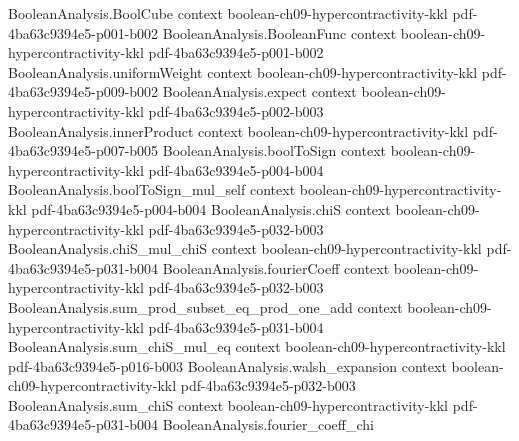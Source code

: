 \begin{lemma}
\leanok
{}
\label{BooleanAnalysis.Hypercontractivity.noise_op_norm_dual}
\proofstep
  {BooleanAnalysis.BoolCube}
  {context}
  {boolean-ch09-hypercontractivity-kkl}
  {pdf-4ba63c9394e5-p001-b002}
\proofstep
  {BooleanAnalysis.BooleanFunc}
  {context}
  {boolean-ch09-hypercontractivity-kkl}
  {pdf-4ba63c9394e5-p001-b002}
\proofstep
  {BooleanAnalysis.uniformWeight}
  {context}
  {boolean-ch09-hypercontractivity-kkl}
  {pdf-4ba63c9394e5-p009-b002}
\proofstep
  {BooleanAnalysis.expect}
  {context}
  {boolean-ch09-hypercontractivity-kkl}
  {pdf-4ba63c9394e5-p002-b003}
\proofstep
  {BooleanAnalysis.innerProduct}
  {context}
  {boolean-ch09-hypercontractivity-kkl}
  {pdf-4ba63c9394e5-p007-b005}
\proofstep
  {BooleanAnalysis.boolToSign}
  {context}
  {boolean-ch09-hypercontractivity-kkl}
  {pdf-4ba63c9394e5-p004-b004}
\proofstep
  {BooleanAnalysis.boolToSign_mul_self}
  {context}
  {boolean-ch09-hypercontractivity-kkl}
  {pdf-4ba63c9394e5-p004-b004}
\proofstep
  {BooleanAnalysis.chiS}
  {context}
  {boolean-ch09-hypercontractivity-kkl}
  {pdf-4ba63c9394e5-p032-b003}
\proofstep
  {BooleanAnalysis.chiS_mul_chiS}
  {context}
  {boolean-ch09-hypercontractivity-kkl}
  {pdf-4ba63c9394e5-p031-b004}
\proofstep
  {BooleanAnalysis.fourierCoeff}
  {context}
  {boolean-ch09-hypercontractivity-kkl}
  {pdf-4ba63c9394e5-p032-b003}
\proofstep
  {BooleanAnalysis.sum_prod_subset_eq_prod_one_add}
  {context}
  {boolean-ch09-hypercontractivity-kkl}
  {pdf-4ba63c9394e5-p031-b004}
\proofstep
  {BooleanAnalysis.sum_chiS_mul_eq}
  {context}
  {boolean-ch09-hypercontractivity-kkl}
  {pdf-4ba63c9394e5-p016-b003}
\proofstep
  {BooleanAnalysis.walsh_expansion}
  {context}
  {boolean-ch09-hypercontractivity-kkl}
  {pdf-4ba63c9394e5-p032-b003}
\proofstep
  {BooleanAnalysis.sum_chiS}
  {context}
  {boolean-ch09-hypercontractivity-kkl}
  {pdf-4ba63c9394e5-p031-b004}
\proofstep
  {BooleanAnalysis.fourier_coeff_chi}

\end{lemma}
